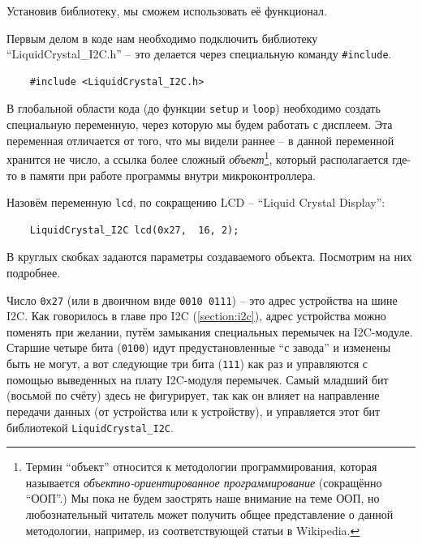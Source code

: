 \documentclass[../sparc.tex]{subfiles}
\begin{document}
Установив библиотеку, мы сможем использовать её функционал.

Первым делом в коде нам необходимо подключить библиотеку \\
``LiquidCrystal\_I2C.h'' -- это делается через специальную команду
\texttt{\#include}.

\begin{listing}[ht]
  \begin{verbatim}
    #include <LiquidCrystal_I2C.h>
  \end{verbatim}
  \caption{Подключение заголовочного файла для работы с дисплеем.}
  \label{listing:game-dev-lcd-include}
\end{listing}

В глобальной области кода (до функции \texttt{setup} и \texttt{loop}) необходимо
создать специальную переменную, через которую мы будем работать с дисплеем. Эта
переменная отличается от того, что мы видели раннее -- в данной переменной
хранится не число, а ссылка более сложный \emph{объект}\footnote{Термин
``объект'' относится к методологии программирования, которая называется
\emph{объектно-ориентированное программирование} (сокращённо ``ООП''.)  Мы пока
не будем заострять наше внимание на теме ООП, но любознательный читатель может
получить общее представление о данной методологии, например, из соответствующей
статьи в Wikipedia.}, который располагается где-то в памяти при работе программы
внутри микроконтроллера.

Назовём переменную \texttt{lcd}, по сокращению \gls{LCD} -- ``Liquid Crystal
Display'':

\begin{listing}[ht]
  \begin{verbatim}
    LiquidCrystal_I2C lcd(0x27,  16, 2);
  \end{verbatim}
  \caption{Создание объекта для работы с ЖК-дисплеем.}
  \label{listing:game-dev-lcd-object}
\end{listing}

В круглых скобках задаются параметры создаваемого объекта.  Посмотрим на них
подробнее.

Число \texttt{0x27} (или в двоичном виде \texttt{0010 0111}) -- это адрес
устройства на шине I2C.  Как говорилось в главе про I2C (\ref{section:i2c}),
адрес устройства можно поменять при желании, путём замыкания специальных
перемычек на I2C-модуле.  Старшие четыре бита (\texttt{0100}) идут
предустановленные ``с завода'' и изменены быть не могут, а вот следующие три
бита (\texttt{111}) как раз и управляются с помощью выведенных на плату
I2C-модуля перемычек.  Самый младший бит (восьмой по счёту) здесь не фигурирует,
так как он влияет на направление передачи данных (от устройства или к
устройству), и управляется этот бит библиотекой \texttt{LiquidCrystal\_I2C}.
\end{document}
